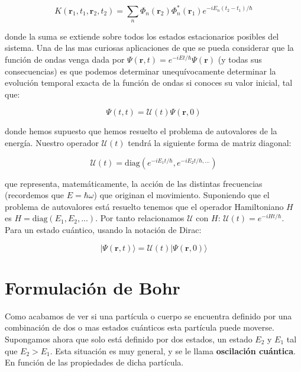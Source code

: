 \documentclass[12pt]{article}
\newcommand{\parentesis}[1]{\left( #1  \right)}
\newcommand{\rn}{\mathbf{r}}
\begin{document}
\begin{equation}
K(\rn_1,t_1,\rn_2,t_2) = \sum_n \Phi_n (\rn_2) \Phi_n^* (\rn_1) e^{-i E_n (t_2-t_1)/\hbar}
\end{equation}

donde la suma se extiende sobre todos los estados estacionarios posibles del sistema. Una de las mas curiosas aplicaciones de que se pueda considerar que la función de ondas venga dada por $\Psi (\rn,t) = e^{- i E t/\hbar} \Psi (\rn)$ (y todas sus consecuencias) es que podemos determinar unequívocamente determinar la evolución temporal exacta de la función de ondas si conoces su valor inicial, tal que:

\begin{equation}
\Psi (t,t) = \mathcal{U}(t)  \Psi (\rn,0)
\end{equation}

donde hemos supuesto que hemos resuelto el problema de autovalores de la energía. Nuestro operador $\mathcal{U}(t)$ tendrá la siguiente forma de matriz diagonal:

\begin{equation}
\mathcal{U}(t)  = \mathrm{diag} \parentesis{e^{-i E_1 t / \hbar}, e^{-i E_2 t / \hbar, ...}}
\end{equation}

que representa, matemáticamente, la acción de las distintas frecuencias (recordemos que $E = \hbar \omega$) que originan el movimiento. Suponiendo que el problema de autovalores está resuelto tenemos que el operador Hamiltoniano $H$ es $H = \mathrm{diag} \parentesis{E_1,E_2,...}$. Por tanto relacionamos $\mathcal{U}$ con $H$: $\mathcal{U}(t) = e^{-iHt/\hbar}$. Para un estado cuántico, usando la notación de Dirac:

\begin{equation}
| \Psi (\rn,t) \rangle = \mathcal{U} (t) | \Psi (\rn,0) \rangle
\end{equation}

\section{Formulación de Bohr}

Como acabamos de ver si una partícula o cuerpo se encuentra definido por una combinación de dos o mas estados cuánticos esta partícula puede moverse. Supongamos ahora que solo está definido por dos estados, un estado $E_2$ y $E_1$ tal que $E_2 > E_1$. Esta situación es muy general, y se le llama \textbf{oscilación cuántica}. En función de las propiedades de dicha partícula. \\
\end{document}
